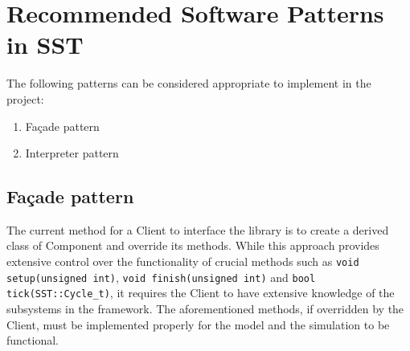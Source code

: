 \section{Recommended Software Patterns in SST}
The following patterns can be considered appropriate to implement in the project:
\begin{enumerate}
    \item Façade pattern
    \item Interpreter pattern
\end{enumerate}

\subsection{Façade pattern}
The current method for a Client to interface the library is to create a derived class of Component and override its methods. While this approach provides extensive control over the functionality of crucial methods such as \texttt{void setup(unsigned int)}, \texttt{void finish(unsigned int)} and \texttt{bool tick(SST::Cycle\_t)}, it requires the Client to have extensive knowledge of the subsystems in the framework. The aforementioned methods, if overridden by the Client, must be implemented properly for the model and the simulation to be functional.

